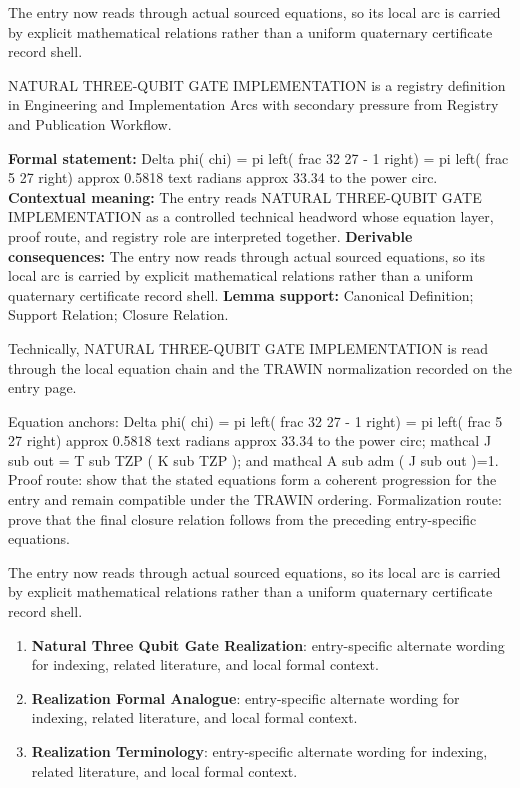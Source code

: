 The entry now reads through actual sourced equations, so its local arc is carried by explicit mathematical relations rather than a uniform quaternary certificate record shell.
\clearpage


\begingroup\small
{}
NATURAL THREE-QUBIT GATE IMPLEMENTATION is a registry definition in Engineering and Implementation Arcs with secondary pressure from Registry and Publication Workflow.

\begingroup\footnotesize\setlength{\emergencystretch}{3em}\sloppy
\textbf{Formal statement:} Delta phi( chi) = pi left( frac 32 27 - 1 right) = pi left( frac 5 27 right) approx 0.5818 text radians approx 33.34 to the power circ. \textbf{Contextual meaning:} The entry reads NATURAL THREE-QUBIT GATE IMPLEMENTATION as a controlled technical headword whose equation layer, proof route, and registry role are interpreted together. \textbf{Derivable consequences:} The entry now reads through actual sourced equations, so its local arc is carried by explicit mathematical relations rather than a uniform quaternary certificate record shell. \textbf{Lemma support:} Canonical Definition; Support Relation; Closure Relation.\par
\endgroup

Technically, NATURAL THREE-QUBIT GATE IMPLEMENTATION is read through the local equation chain and the TRAWIN normalization recorded on the entry page.

Equation anchors: Delta phi( chi) = pi left( frac 32 27 - 1 right) = pi left( frac 5 27 right) approx 0.5818 text radians approx 33.34 to the power circ; mathcal J sub out = T sub TZP ( K sub TZP ); and mathcal A sub adm ( J sub out )=1. Proof route: show that the stated equations form a coherent progression for the entry and remain compatible under the TRAWIN ordering. Formalization route: prove that the final closure relation follows from the preceding entry-specific equations.

The entry now reads through actual sourced equations, so its local arc is carried by explicit mathematical relations rather than a uniform quaternary certificate record shell.
\endgroup

\begin{enumerate}[leftmargin=1.6em,itemsep=6pt,topsep=4pt]
\item \textbf{Natural Three Qubit Gate Realization}: entry-specific alternate wording for indexing, related literature, and local formal context.
\item \textbf{Realization Formal Analogue}: entry-specific alternate wording for indexing, related literature, and local formal context.
\item \textbf{Realization Terminology}: entry-specific alternate wording for indexing, related literature, and local formal context.
\end{enumerate}

